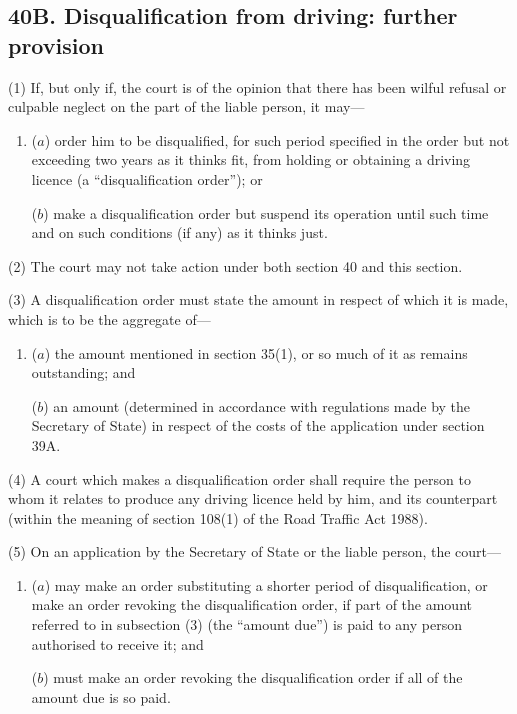 \documentclass[12pt,a4paper]{article}
\begin{document}
\subsection{40B. Disqualification from driving: further provision}

(1) If, but only if, the court is of the opinion that there has been wilful
refusal or culpable neglect on the part of the liable person, it may---
\begin{enumerate}\item[]
 ($a$) order him to be disqualified, for such period specified in the order but not
exceeding two years as it thinks fit, from holding or obtaining a driving
licence (a “disqualification order”); or

($b$) make a disqualification order but suspend its operation until such time and
on such conditions (if any) as it thinks just.
\end{enumerate}

(2) The court may not take action under both section 40 and this section.

(3) A disqualification order must state the amount in respect of which it is made,
which is to be the aggregate of---
\begin{enumerate}\item[]
($a$) the amount mentioned in section 35(1), or so much of it as remains
outstanding; and

($b$) an amount (determined in accordance with regulations made by the Secretary
of State) in respect of the costs of the application under section 39A.
\end{enumerate}

(4) A court which makes a disqualification order shall require the person to whom
it relates to produce any driving licence held by him, and its counterpart (within the
meaning of section 108(1) of the Road Traffic Act 1988).

(5) On an application by the Secretary of State or the liable person, the court---
\begin{enumerate}\item[]
($a$) may make an order substituting a shorter period of disqualification, or make an order revoking the disqualification order, if part of the amount referred to in subsection (3) (the “amount due”) is paid to any person authorised to receive it; and

($b$) must make an order revoking the disqualification order if all of the amount due is so paid.
\end{enumerate}
\end{document}
